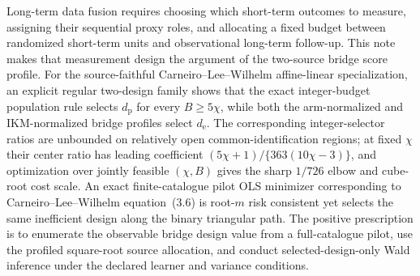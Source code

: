 Long-term data fusion requires choosing which short-term outcomes to measure, assigning their sequential proxy roles, and allocating a fixed budget between randomized short-term units and observational long-term follow-up.  This note makes that measurement design the argument of the two-source bridge score profile.  For the source-faithful Carneiro--Lee--Wilhelm affine-linear specialization, an explicit regular two-design family shows that the exact integer-budget population rule selects \(d_{\mathrm p}\) for every \(B\ge5\chi\), while both the arm-normalized and IKM-normalized bridge profiles select \(d_{\mathrm e}\).  The corresponding integer-selector ratios are unbounded on relatively open common-identification regions; at fixed \(\chi\) their center ratio has leading coefficient \((5\chi+1)/\{363(10\chi-3)\}\), and optimization over jointly feasible \((\chi,B)\) gives the sharp \(1/726\) elbow and cube-root cost scale.  An exact finite-catalogue pilot OLS minimizer corresponding to Carneiro--Lee--Wilhelm equation~(3.6) is root-\(m\) risk consistent yet selects the same inefficient design along the binary triangular path.  The positive prescription is to enumerate the observable bridge design value from a full-catalogue pilot, use the profiled square-root source allocation, and conduct selected-design-only Wald inference under the declared learner and variance conditions.